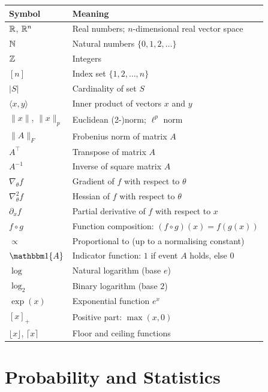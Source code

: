 \begin{center}
\begin{tabular}{@{}ll@{}}
\toprule
\textbf{Symbol} & \textbf{Meaning} \\
\midrule
$\mathbb{R}$, $\mathbb{R}^n$ & Real numbers; $n$-dimensional real vector space \\
$\mathbb{N}$         & Natural numbers $\{0,1,2,\ldots\}$ \\
$\mathbb{Z}$         & Integers \\
$[n]$        & Index set $\{1,2,\ldots,n\}$ \\
$|S|$        & Cardinality of set $S$ \\
$\langle x, y\rangle$ & Inner product of vectors $x$ and $y$ \\
$\|x\|$, $\|x\|_p$   & Euclidean (2-)norm; $\ell^p$ norm \\
$\|A\|_F$    & Frobenius norm of matrix $A$ \\
$A^\top$     & Transpose of matrix $A$ \\
$A^{-1}$     & Inverse of square matrix $A$ \\
$\nabla_\theta f$ & Gradient of $f$ with respect to $\theta$ \\
$\nabla^2_\theta f$ & Hessian of $f$ with respect to $\theta$ \\
$\partial_x f$ & Partial derivative of $f$ with respect to $x$ \\
$f \circ g$  & Function composition: $(f\circ g)(x)=f(g(x))$ \\
$\propto$    & Proportional to (up to a normalising constant) \\
$\ind\{A\}$  & Indicator function: $1$ if event $A$ holds, else $0$ \\
$\log$       & Natural logarithm (base $e$) \\
$\log_2$     & Binary logarithm (base $2$) \\
$\exp(x)$    & Exponential function $e^x$ \\
$[x]_+$      & Positive part: $\max(x,0)$ \\
$\lfloor x \rfloor$, $\lceil x \rceil$ & Floor and ceiling functions \\
\bottomrule
\end{tabular}
\end{center}

\section*{Probability and Statistics}

